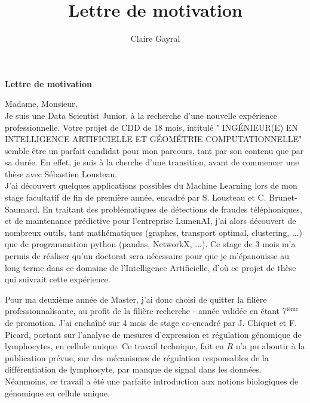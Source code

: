 \documentclass[a4paper,12pt]{article}
\title{Lettre de motivation}
\author{Claire Gayral}
\date{}
\begin{document}
{\centering \Large \bf Lettre de motivation \\ \vspace{0.6cm} }

Madame, Monsieur, 
\\

Je suis une Data Scientist Junior, à la recherche d'une nouvelle expérience professionnelle. Votre projet de CDD de 18 mois, intitulé " INGÉNIEUR(E) EN INTELLIGENCE ARTIFICIELLE ET GÉOMÉTRIE COMPUTATIONNELLE" semble être un parfait candidat pour mon parcours, tant par son contenu que par sa durée. En effet, je suis à la cherche d'une transition, avant de commencer une thèse avec Sébastien Lousteau. \\%

J'ai découvert quelques applications possibles du Machine Learning lors de mon stage facultatif de fin de première année, encadré par S. Lousteau et C. Brunet-Saumard.
En traitant des problématiques de détections de fraudes téléphoniques, et de maintenance prédictive pour l'entreprise LumenAI, j'ai alors découvert de nombreux outils, tant mathématiques (graphes, transport optimal, clustering, ...) que de programmation python (pandas, NetworkX, ...). 
Ce stage de 3 mois m'a permis de réaliser qu'un doctorat sera nécessaire pour que je m'épanouisse au long terme dans ce domaine de l'Intelligence Artificielle, d'où ce projet de thèse qui suivrait cette expérience. 

Pour ma deuxième année de Master, j'ai donc choisi de quitter la filière professionnalisante, au profit de la filière recherche - année validée en étant 7$^{\text{ième}}$ de promotion. 
J'ai enchaîné sur 4 mois de stage co-encadré par J. Chiquet et F. Picard, portant sur l'analyse de mesures d'expression et régulation génomique de lymphocytes, en cellule unique. Ce travail technique, fait en $R$ n'a pu aboutir à la publication prévue, sur des mécanismes de régulation responsables de la différentiation de lymphocyte, par manque de signal dans les données. Néanmoins, ce travail a été une parfaite introduction aux notions biologiques de génomique en cellule unique.
%
%
\end{document}
